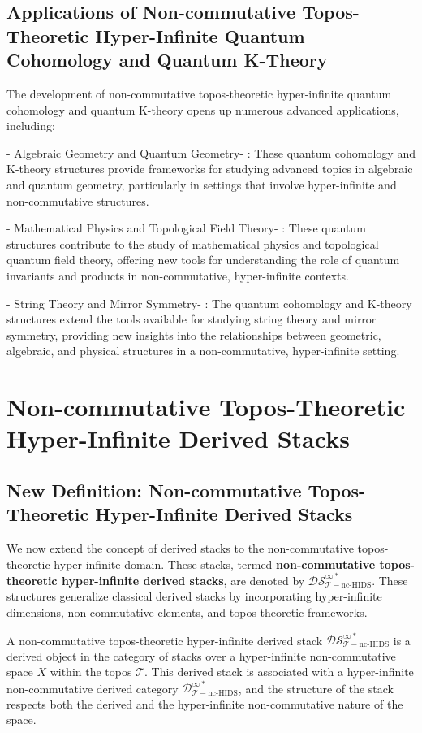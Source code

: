 \documentclass{article}
\begin{document}
\subsection{Applications of Non-commutative Topos-Theoretic Hyper-Infinite Quantum Cohomology and Quantum K-Theory}
The development of non-commutative topos-theoretic hyper-infinite quantum cohomology and quantum K-theory opens up numerous advanced applications, including:

-  Algebraic Geometry and Quantum Geometry- : These quantum cohomology and K-theory structures provide frameworks for studying advanced topics in algebraic and quantum geometry, particularly in settings that involve hyper-infinite and non-commutative structures.

-  Mathematical Physics and Topological Field Theory- : These quantum structures contribute to the study of mathematical physics and topological quantum field theory, offering new tools for understanding the role of quantum invariants and products in non-commutative, hyper-infinite contexts.

-  String Theory and Mirror Symmetry- : The quantum cohomology and K-theory structures extend the tools available for studying string theory and mirror symmetry, providing new insights into the relationships between geometric, algebraic, and physical structures in a non-commutative, hyper-infinite setting.


\section{Non-commutative Topos-Theoretic Hyper-Infinite Derived Stacks}
\subsection{New Definition: Non-commutative Topos-Theoretic Hyper-Infinite Derived Stacks}
We now extend the concept of derived stacks to the non-commutative topos-theoretic hyper-infinite domain. These stacks, termed \textbf{non-commutative topos-theoretic hyper-infinite derived stacks}, are denoted by \(\mathcal{DS}_{\mathcal{T}-\text{nc-HIDS}}^{\infty *}\). These structures generalize classical derived stacks by incorporating hyper-infinite dimensions, non-commutative elements, and topos-theoretic frameworks.

A non-commutative topos-theoretic hyper-infinite derived stack \(\mathcal{DS}_{\mathcal{T}-\text{nc-HIDS}}^{\infty *}\) is a derived object in the category of stacks over a hyper-infinite non-commutative space \(X\) within the topos \(\mathcal{T}\). This derived stack is associated with a hyper-infinite non-commutative derived category \(\mathcal{D}_{\mathcal{T}-\text{nc-HIDS}}^{\infty *}\), and the structure of the stack respects both the derived and the hyper-infinite non-commutative nature of the space.
\end{document}
